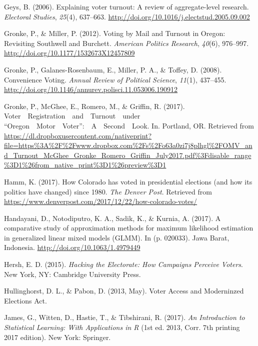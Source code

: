 \documentclass[12pt,twoside]{reedthesis}
\begin{document}
  \hypertarget{ref-geys_explaining_2006}{}
  Geys, B. (2006). Explaining voter turnout: A review of aggregate-level
  research. \emph{Electoral Studies}, \emph{25}(4), 637--663.
  \url{http://doi.org/10.1016/j.electstud.2005.09.002}
  
  \hypertarget{ref-gronke_voting_2012}{}
  Gronke, P., \& Miller, P. (2012). Voting by Mail and Turnout in Oregon:
  Revisiting Southwell and Burchett. \emph{American Politics Research},
  \emph{40}(6), 976--997. \url{http://doi.org/10.1177/1532673X12457809}
  
  \hypertarget{ref-gronke_convenience_2008}{}
  Gronke, P., Galanes-Rosenbaum, E., Miller, P. A., \& Toffey, D. (2008).
  Convenience Voting. \emph{Annual Review of Political Science},
  \emph{11}(1), 437--455.
  \url{http://doi.org/10.1146/annurev.polisci.11.053006.190912}
  
  \hypertarget{ref-gronke_voter_2017}{}
  Gronke, P., McGhee, E., Romero, M., \& Griffin, R. (2017).
  Voter~~Registration~~and~~Turnout~~under
  ``Oregon~~Motor~~Voter'':~~A~~Second~~Look. In. Portland, OR. Retrieved
  from
  \url{https://dl.dropboxusercontent.com/nativeprint?file=https\%3A\%2F\%2Fwww.dropbox.com\%2Fs\%2Fo63a0zi7j8plhgl\%2FOMV_and_Turnout_McGhee_Gronke_Romero_Griffin_July2017.pdf\%3Fdisable_range\%3D1\%26from_native_print\%3D1\%26preview\%3D1}
  
  \hypertarget{ref-hamm_how_2017}{}
  Hamm, K. (2017). How Colorado has voted in presidential elections (and
  how its politics have changed) since 1980. \emph{The Denver Post}.
  Retrieved from
  \url{https://www.denverpost.com/2017/12/22/how-colorado-votes/}
  
  \hypertarget{ref-handayani_comparative_2017}{}
  Handayani, D., Notodiputro, K. A., Sadik, K., \& Kurnia, A. (2017). A
  comparative study of approximation methods for maximum likelihood
  estimation in generalized linear mixed models (GLMM). In (p. 020033).
  Jawa Barat, Indonesia. \url{http://doi.org/10.1063/1.4979449}
  
  \hypertarget{ref-hersh_hacking_2015}{}
  Hersh, E. D. (2015). \emph{Hacking the Electorate: How Campaigns
  Perceive Voters}. New York, NY: Cambridge University Press.
  
  \hypertarget{ref-hullinghorst_voter_2013}{}
  Hullinghorst, D. L., \& Pabon, D. (2013, May). Voter Access and
  Moderninzed Elections Act.
  
  \hypertarget{ref-james_introduction_2017}{}
  James, G., Witten, D., Hastie, T., \& Tibshirani, R. (2017). \emph{An
  Introduction to Statistical Learning: With Applications in R} (1st ed.
  2013, Corr. 7th printing 2017 edition). New York: Springer.
  
\end{document}
